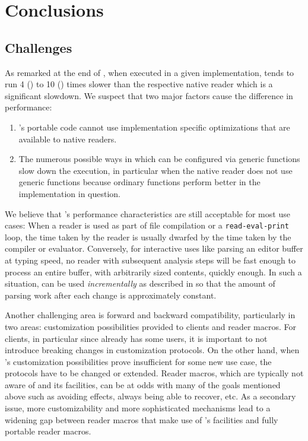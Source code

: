 \section{Conclusions}

\subsection{Challenges}

As remarked at the end of , when executed in a
given \cl{} implementation, \eclector{} tends to run 4 (\sbcl{}) to 10
(\ccl{}) times slower than the respective native reader which is a
significant slowdown.  We suspect that two major factors cause the
difference in performance:
\begin{enumerate}
\item \eclector{}'s portable code cannot use implementation specific
  optimizations that are available to native readers.
\item The numerous possible ways in which \eclector{} can be
  configured via generic functions slow down the execution, in
  particular when the native reader does not use generic functions
  because ordinary functions perform better in the implementation in
  question.
\end{enumerate}
We believe that \eclector{}'s performance characteristics are still
acceptable for most use cases: When a reader is used as part of file
compilation or a \texttt{read-eval-print} loop, the time taken by the
reader is usually dwarfed by the time taken by the compiler or
evaluator.  Conversely, for interactive uses like parsing an editor
buffer at typing speed, no reader with subsequent analysis steps will
be fast enough to process an entire buffer, with arbitrarily sized
contents, quickly enough.  In such a situation, \eclector{} can be
used \emph{incrementally} as described in
 so that the amount of parsing work
after each change is approximately constant.


Another challenging area is forward and backward compatibility,
particularly in two areas: customization possibilities provided to
clients and reader macros.  For clients, in particular since
\eclector{} already has some users, it is important to not introduce
breaking changes in customization protocols.  On the other hand, when
\eclector{}'s customization possibilities prove insufficient for some
new use case, the protocols have to be changed or extended.  Reader
macros, which are typically not aware of \eclector{} and its
facilities, can be at odds with many of the goals mentioned above such
as avoiding effects, always being able to recover, etc.  As a
secondary issue, more customizability and more sophisticated
mechanisms lead to a widening gap between reader macros that make use
of \eclector{}'s facilities and fully portable reader macros.


